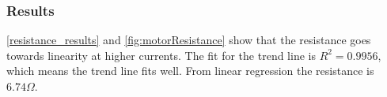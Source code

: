 \subsubsection{Results}
\begin{table}[H]
\centering
{}
\caption{Results from the resistance measurement.}
\label{resistance_results}
\end{table}
\vspace{-5mm}
\autoref{resistance_results} and \autoref{fig:motorResistance} show that the resistance goes towards linearity at higher currents. The fit for the trend line is $R^2=0.9956$, which means the trend line fits well. From linear regression the resistance is $6.74 \Omega$.

